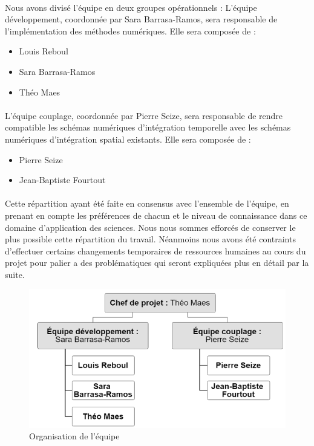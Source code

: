     \paragraph{}
    Nous avons divisé l'équipe en deux groupes opérationnels :
    L'équipe développement, coordonnée par Sara Barrasa-Ramos, sera responsable de l'implémentation des méthodes numériques. Elle sera composée de :
   	    \begin{itemize}
   	    \item Louis Reboul
   	    \item Sara Barrasa-Ramos
   	    \item Théo Maes
    \end{itemize}
    \paragraph{}
    L'équipe couplage, coordonnée par Pierre Seize, sera responsable de rendre compatible les schémas numériques d'intégration temporelle avec les schémas numériques d'intégration spatial existants. Elle sera composée de :
   \begin{itemize}
        \item Pierre Seize
   	    \item Jean-Baptiste Fourtout
    \end{itemize}
   \paragraph{}
   Cette répartition ayant été faite en consensus avec l'ensemble de l'équipe, en prenant en compte les préférences de chacun et le niveau de connaissance dans ce domaine d'application des sciences. Nous nous sommes efforcés de conserver le plus possible cette répartition du travail.  Néanmoins nous avons été contraints d'effectuer certains changements temporaires de ressources humaines au cours du projet pour palier a des problématiques qui seront expliquées plus en détail par la suite.
    \begin{figure}[h]
    \centering
        \includegraphics[scale=0.7]{images/OBS.png}
      	\caption{Organisation de l'équipe} 
   \label{fig:OBS}
    \end{figure}

